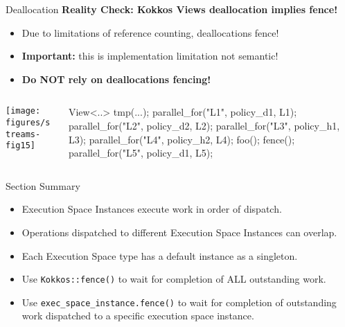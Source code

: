 \begin{frame}[fragile]{Deallocation}
	\textbf{Reality Check: Kokkos Views deallocation implies fence!}
  \begin{itemize}
    \item{Due to limitations of reference counting, deallocations fence!}
    \item{\textbf{Important:} this is implementation limitation not semantic!}
    \item{\textbf{Do NOT rely on deallocations fencing!}}
  \end{itemize}

  \begin{columns}[]
    \begin{column}{.67\textwidth}

       \texttt{[image: figures/streams-fig15]} 
 
    \end{column}

    \begin{column}{.33\textwidth}
	    \begin{code}[linebackgroundcolor={},keywords={L1,L2,policy_device}]
{
View<..> tmp(...);
parallel_for("L1", 
  policy_d1, L1);
parallel_for("L2", 
  policy_d2, L2);
parallel_for("L3", 
  policy_h1, L3);
parallel_for("L4", 
  policy_h2, L4);
}
foo();
fence();
parallel_for("L5", 
  policy_d1, L5);
      \end{code}
    \end{column}
  \end{columns}
\end{frame}


\begin{frame}{Section Summary}

  \begin{itemize}
    \item{Execution Space Instances execute work in order of dispatch.}
    \item{Operations dispatched to different Execution Space Instances can overlap.}
    \item{Each Execution Space type has a default instance as a singleton.}
    \item{Use \texttt{Kokkos::fence()} to wait for completion of ALL outstanding work.}
    \item{Use \texttt{exec\_space\_instance.fence()} to wait for completion of outstanding work dispatched to a specific execution space instance.}
  \end{itemize}

\end{frame}
